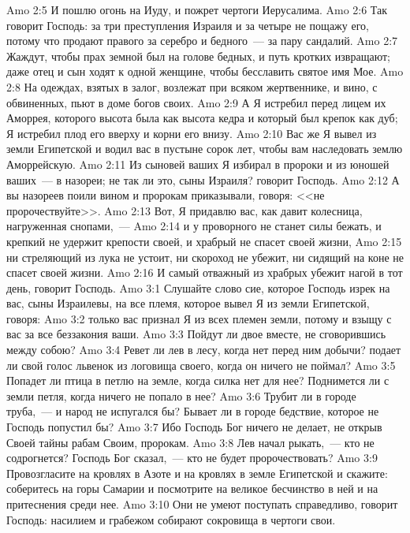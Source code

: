 \vs Amo 2:5 И пошлю огонь на Иуду, и пожрет чертоги Иерусалима.
\vs Amo 2:6 Так говорит Господь: за три преступления Израиля и за четыре не пощажу его, потому что продают правого за серебро и бедного~--- за пару сандалий.
\vs Amo 2:7 Жаждут, чтобы прах земной был на голове бедных, и путь кротких извращают; даже отец и сын ходят к одной женщине, чтобы бесславить святое имя Мое.
\vs Amo 2:8 На одеждах, взятых в залог, возлежат при всяком жертвеннике, и вино,  с обвиненных, пьют в доме богов своих.
\vs Amo 2:9 А Я истребил перед лицем их Аморрея, которого высота была как высота кедра и который был крепок как дуб; Я истребил плод его вверху и корни его внизу.
\vs Amo 2:10 Вас же Я вывел из земли Египетской и водил вас в пустыне сорок лет, чтобы вам наследовать землю Аморрейскую.
\vs Amo 2:11 Из сыновей ваших Я избирал в пророки и из юношей ваших~--- в назореи; не так ли это, сыны Израиля? говорит Господь.
\vs Amo 2:12 А вы назореев поили вином и пророкам приказывали, говоря: <<не пророчествуйте>>.
\vs Amo 2:13 Вот, Я придавлю вас, как давит колесница, нагруженная снопами,~---
\vs Amo 2:14 и у проворного не станет силы бежать, и крепкий не удержит крепости своей, и храбрый не спасет своей жизни,
\vs Amo 2:15 ни стреляющий из лука не устоит, ни скороход не убежит, ни сидящий на коне не спасет своей жизни.
\vs Amo 2:16 И самый отважный из храбрых убежит нагой в тот день, говорит Господь.
\vs Amo 3:1 Слушайте слово сие, которое Господь изрек на вас, сыны Израилевы, на все племя, которое вывел Я из земли Египетской, говоря:
\vs Amo 3:2 только вас признал Я из всех племен земли, потому и взыщу с вас за все беззакония ваши.
\vs Amo 3:3 Пойдут ли двое вместе, не сговорившись между собою?
\vs Amo 3:4 Ревет ли лев в лесу, когда нет перед ним добычи? подает ли свой голос львенок из логовища своего, когда он ничего не поймал?
\vs Amo 3:5 Попадет ли птица в петлю на земле, когда силка нет для нее? Поднимется ли с земли петля, когда ничего не попало в нее?
\vs Amo 3:6 Трубит ли в городе труба,~--- и народ не испугался бы? Бывает ли в городе бедствие, которое не Господь попустил бы?
\vs Amo 3:7 Ибо Господь Бог ничего не делает, не открыв Своей тайны рабам Своим, пророкам.
\vs Amo 3:8 Лев начал рыкать,~--- кто не содрогнется? Господь Бог сказал,~--- кто не будет пророчествовать?
\vs Amo 3:9 Провозгласите на кровлях в Азоте и на кровлях в земле Египетской и скажите: соберитесь на горы Самарии и посмотрите на великое бесчинство в ней и на притеснения среди нее.
\vs Amo 3:10 Они не умеют поступать справедливо, говорит Господь: насилием и грабежом собирают сокровища в чертоги свои.
